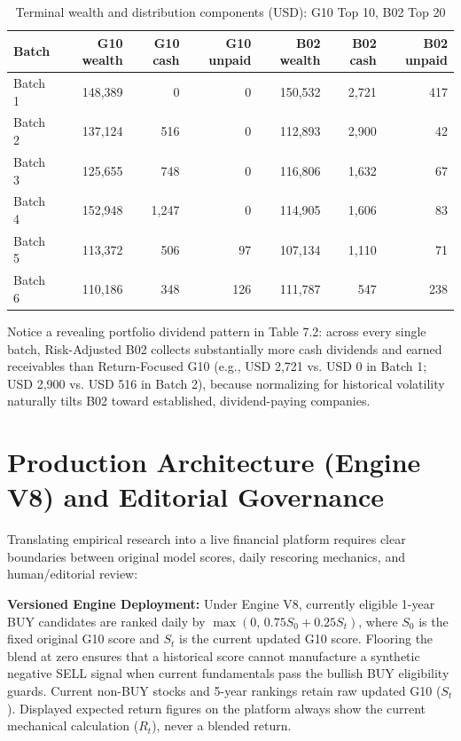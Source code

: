 \documentclass[11pt,a4paper]{article}
\numberwithin{table}{section}
\begin{document}
\begin{minipage}{\linewidth}
\begin{center}\small\setlength{\tabcolsep}{3pt}\renewcommand{\arraystretch}{1.18}
\begin{longtable}{@{}lrrrrrr@{}}
\caption{Terminal wealth and distribution components (USD): G10 Top 10, B02 Top 20}\\
\toprule
Batch & G10 wealth & G10 cash & G10 unpaid & B02 wealth & B02 cash & B02 unpaid\\\midrule\endhead
Batch 1 & 148,389 & 0 & 0 & 150,532 & 2,721 & 417\\
Batch 2 & 137,124 & 516 & 0 & 112,893 & 2,900 & 42\\
Batch 3 & 125,655 & 748 & 0 & 116,806 & 1,632 & 67\\
Batch 4 & 152,948 & 1,247 & 0 & 114,905 & 1,606 & 83\\
Batch 5 & 113,372 & 506 & 97 & 107,134 & 1,110 & 71\\
Batch 6 & 110,186 & 348 & 126 & 111,787 & 547 & 238\\
\bottomrule\end{longtable}\end{center}
\end{minipage}\par
Notice a revealing portfolio dividend pattern in Table 7.2: across every single batch, Risk-Adjusted B02 collects substantially more cash dividends and earned receivables than Return-Focused G10 (e.g., USD 2,721 vs. USD 0 in Batch 1; USD 2,900 vs. USD 516 in Batch 2), because normalizing for historical volatility naturally tilts B02 toward established, dividend-paying companies.



\section{Production Architecture (Engine V8) and Editorial Governance}

Translating empirical research into a live financial platform requires clear boundaries between original model scores, daily rescoring mechanics, and human/editorial review:

\textbf{Versioned Engine Deployment:}  Under Engine V8, currently eligible 1-year BUY candidates are ranked daily by $\max(0,\, 0.75S_0 + 0.25S_t)$, where $S_0$ is the fixed original G10 score and $S_t$ is the current updated G10 score. Flooring the blend at zero ensures that a historical score cannot manufacture a synthetic negative SELL signal when current fundamentals pass the bullish BUY eligibility guards. Current non-BUY stocks and 5-year rankings retain raw updated G10 ($S_t$). Displayed expected return figures on the platform always show the current mechanical calculation ($R_t$), never a blended return.
\end{document}
